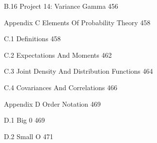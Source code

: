 B.16 Project 14: Variance Gamma 456



Appendix C Elements Of Probability Theory 458



C.1 Definitions 458



C.2 Expectations And Moments 462



C.3 Joint Density And Distribution Functions 464



C.4 Covariances And Correlations 466



Appendix D Order Notation 469



D.1 Big 0 469



D.2 Small O 471

